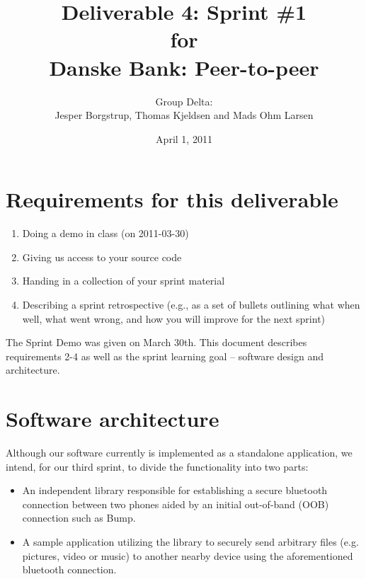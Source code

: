 \documentclass[a4paper,11pt]{article}
\title{Deliverable 4: Sprint \#1\\\small{for}\\\small{Danske Bank: Peer-to-peer}}
\author{ Group Delta:\\Jesper Borgstrup, Thomas Kjeldsen and Mads Ohm Larsen }
\date{April 1, 2011}
\begin{document}
\ifpdf
{}
\else
{}
\fi

\maketitle



\section{Requirements for this deliverable}
\begin{enumerate}
\item Doing a demo in class (on 2011-03-30)
\item Giving us access to your source code
\item Handing in a collection of your sprint material
\item Describing a sprint retrospective (e.g., as a set of bullets outlining what
when well, what went wrong, and how you will improve for the next sprint)
\end{enumerate}

The Sprint Demo was given on March 30th. This document describes requirements 2-4 as well as the sprint learning goal -- software design and architecture.


\section{Software architecture}
Although our software currently is implemented as a standalone application, we intend, for our third sprint, to divide the functionality into two parts:
\begin{itemize}
\item An independent library responsible for establishing a secure bluetooth connection between two phones aided by an initial out-of-band (OOB) connection such as Bump.
\item A sample application utilizing the library to securely send arbitrary files (e.g. pictures, video or music) to another nearby device using the aforementioned bluetooth connection.
\end{itemize}
\end{document}
